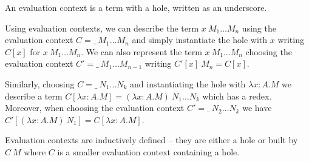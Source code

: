 \documentclass{article}
\newcommand{\red}{\longrightarrow}
\begin{document}
An evaluation context is a term with a hole, written as an underscore.

Using evaluation contexts, we can describe the term $x~M_1 \ldots M_n$ using the evaluation context $C = \_~M_1 \ldots M_n$ and simply instantiate the hole with $x$ writing $C[x]$ for $x~M_1 \ldots M_n$. We can also represent the term $x~M_1 \ldots M_n$ choosing the evaluation context $C' = \_~M_1 \ldots M_{n-1}$ writing $C'[x]~M_n = C[x]$.

Similarly, choosing $C = \_ ~N_1 \ldots N_k$ and instantiating the hole with $\lambda x{:}A.M$ we describe a term $C[\lambda x{:}A.M] = (\lambda x{:}A.M)~N_1 \ldots N_k$ which has a redex. Moreover, when choosing the evaluation context $C' = \_~N_2 \ldots N_k$ we have $C'[(\lambda x{:}A.M)~N_1] = C[\lambda x{:}A.M]$.





Evaluation contexts are inductively defined -- they are either a hole or built by $C~M$ where $C$ is a smaller evaluation context containing a hole.
\end{document}
